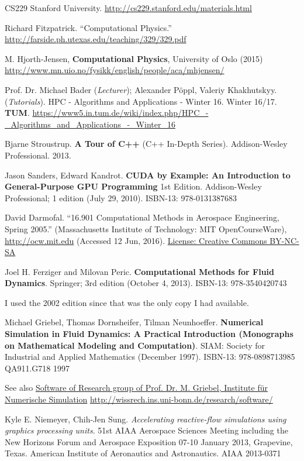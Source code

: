 \documentclass[10pt]{amsart}
\begin{document}
\begin{thebibliography}{9}
CS229 Stanford University.  \url{http://cs229.stanford.edu/materials.html}


Richard Fitzpatrick.  ``Computational Physics.''  \url{http://farside.ph.utexas.edu/teaching/329/329.pdf}

 M. Hjorth-Jensen, \textbf{Computational Physics}, University of Oslo (2015) \url{http://www.mn.uio.no/fysikk/english/people/aca/mhjensen/}

Prof. Dr. Michael Bader (\emph{Lecturer});  Alexander Pöppl, Valeriy Khakhutskyy.  (\emph{Tutorials}).  HPC - Algorithms and Applications - Winter 16.  Winter 16/17.  \textbf{TUM}.  \url{https://www5.in.tum.de/wiki/index.php/HPC_-_Algorithms_and_Applications_-_Winter_16}  

 Bjarne Stroustrup.  \textbf{A Tour of C++} (C++ In-Depth Series). Addison-Wesley Professional.   2013. 
 
Jason Sanders, Edward Kandrot.  \textbf{CUDA by Example: An Introduction to General-Purpose GPU Programming} 1st Edition.  Addison-Wesley Professional; 1 edition (July 29, 2010).  ISBN-13: 978-0131387683

  David Darmofal. ``16.901 Computational Methods in Aerospace Engineering, Spring 2005.'' (Massachusetts Institute of Technology: MIT OpenCourseWare), \url{http://ocw.mit.edu} (Accessed 12 Jun, 2016). \href{http://creativecommons.org/licenses/by-nc-sa/4.0/}{License: Creative Commons BY-NC-SA}

Joel H. Ferziger and Milovan Peric.  \textbf{Computational Methods for Fluid Dynamics}.  Springer; 3rd edition (October 4, 2013).  ISBN-13: 978-3540420743

I used the 2002 edition since that was the only copy I had available.  

Michael Griebel, Thomas Dornsheifer, Tilman Neunhoeffer.  \textbf{Numerical Simulation in Fluid Dynamics: A Practical Introduction (Monographs on Mathematical Modeling and Computation)}.  SIAM: Society for Industrial and Applied Mathematics (December 1997).  ISBN-13: 978-0898713985  QA911.G718  1997
  
See also \href{http://wissrech.ins.uni-bonn.de/research/software/}{Software of Research group of Prof. Dr. M. Griebel, Institute f\"{u}r Numerische Simulation} \url{http://wissrech.ins.uni-bonn.de/research/software/}

Kyle E. Niemeyer, Chih-Jen Sung.  \emph{Accelerating reactive-flow simulations using graphics processing units}.  51st AIAA Aerospace Sciences Meeting including the New Horizons Forum and Aerospace Exposition 07-10 January 2013, Grapevine, Texas. American Institute of Aeronautics and Astronautics.  AIAA 2013-0371


\end{thebibliography}
\end{document}
